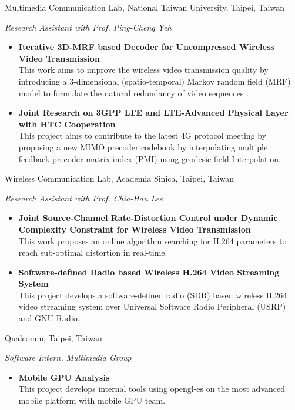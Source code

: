 \documentclass[11pt,letterpaper,sans]{moderncv} %
\begin{document}
%
{Multimedia Communication Lab, National Taiwan University, Taipei, Taiwan}
{}{}{}
{
	\textit{Research Assistant with Prof. Ping-Cheng Yeh}
	\begin{itemize}
		\item \textbf{Iterative 3D-MRF based Decoder for Uncompressed Wireless Video Transmission} \\
		This work aims to improve the wireless video transmission quality by introducing a 3-dimensional (spatio-temporal) Markov random field (MRF) model to formulate the natural redundancy of video sequences . 
		\item \textbf{Joint Research on 3GPP LTE and LTE-Advanced Physical Layer with HTC Cooperation} \\
		This project aims to contribute to the latest 4G protocol meeting by proposing a new MIMO precoder codebook by interpolating multiple feedback precoder matrix index (PMI) using geodesic field Interpolation.
	\end{itemize}
}


%
{Wireless Communication Lab, Academia Sinica, Taipei, Taiwan}
{}{}{}
{
	\textit{Research Assistant with Prof. Chia-Han Lee}
	\begin{itemize}
		\item \textbf{Joint Source-Channel Rate-Distortion Control under Dynamic Complexity Constraint for Wireless Video Transmission} \\
		This work proposes an online algorithm searching for H.264 parameters to reach sub-optimal distortion in real-time.
		\item \textbf{Software-defined Radio based Wireless H.264 Video Streaming System} \\
		This project develops a software-defined radio (SDR) based wireless H.264 video streaming system over Universal Software Radio Peripheral (USRP) and GNU Radio.
	\end{itemize}
}

%
{Qualcomm, Taipei, Taiwan}
{}{}{}
{
	\textit{Software Intern, Multimedia Group}
	\begin{itemize}
		\item \textbf{Mobile GPU Analysis} \\
		This project develops internal tools using opengl-es on the most advanced mobile platform with mobile GPU team.
	\end{itemize}
}
\end{document}
